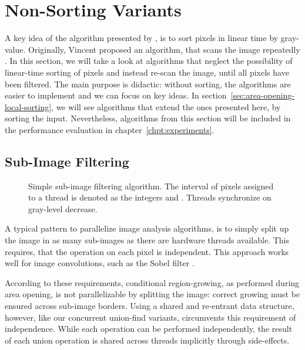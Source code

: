 \section{Non-Sorting Variants}
\label{sec:area-opening-no-sorting}

A key idea of the algorithm presented by \citet{Meijster2002Comparison}, is to
sort pixels in linear time by gray-value. Originally, Vincent proposed an
algorithm, that scans the image repeatedly \cite{Vincent1994Morphological}. In
this section, we will take a look at algorithms that neglect the possibility of
linear-time sorting of pixels and instead re-scan the image, until all pixels
have been filtered. The main purpose is didactic: without sorting, the
algorithms are easier to implement and we can focus on key ideas. In
section~\ref{sec:area-opening-local-sorting}, we will see algorithms that extend
the ones presented here, by sorting the input. Nevertheless, algorithms from
this section will be included in the performance evaluation in
chapter~\ref{chpt:experiments}.

\subsection{Sub-Image Filtering}
\label{sec:area-opening-no-sorting-sub-image}
\begin{figure}
  \centering

  

  \caption[Simple sub-image filtering algorithm.]{Simple sub-image filtering
    algorithm. The interval of pixels assigned to a thread is denoted as the
    integers  and . Threads synchronize on
    gray-level decrease.}
  \label{fig:area-opening-no-sorting-sub-image}
\end{figure}

A typical pattern to parallelize image analysis algorithms, is to simply split
up the image in as many sub-images as there are hardware threads available. This
requires, that the operation on each pixel is independent. This approach works
well for image convolutions, such as the Sobel filter
\cite{Szeliski2011Computer}.

According to these requirements, conditional region-growing, as performed during
area opening, is not parallelizable by splitting the image: correct growing must
be ensured across sub-image borders. Using a shared and re-entrant data
structure, however, like our concurrent union-find variants, circumvents this
requirement of independence. While each operation can be performed
independently, the result of each union operation is shared across threads
implicitly through side-effects.

